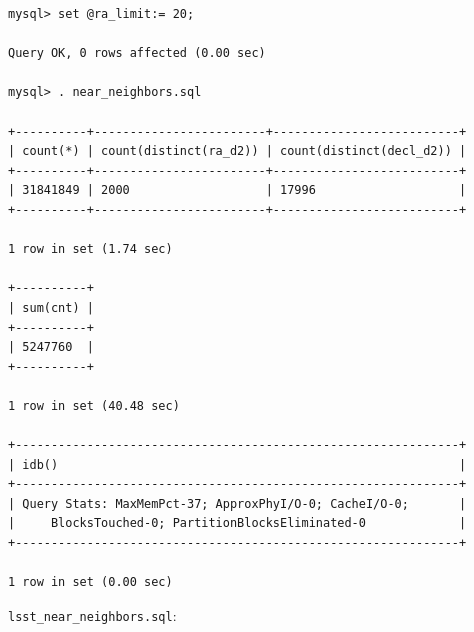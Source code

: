\documentclass[DM,lsstdraft,toc]{lsstdoc}
\begin{document}
\begin{verbatim}
mysql> set @ra_limit:= 20;

Query OK, 0 rows affected (0.00 sec)

mysql> . near_neighbors.sql

+----------+------------------------+--------------------------+
| count(*) | count(distinct(ra_d2)) | count(distinct(decl_d2)) |
+----------+------------------------+--------------------------+
| 31841849 | 2000                   | 17996                    |
+----------+------------------------+--------------------------+

1 row in set (1.74 sec)

+----------+
| sum(cnt) |
+----------+
| 5247760  |
+----------+

1 row in set (40.48 sec)

+--------------------------------------------------------------+
| idb()                                                        |
+--------------------------------------------------------------+
| Query Stats: MaxMemPct-37; ApproxPhyI/O-0; CacheI/O-0;       |
|     BlocksTouched-0; PartitionBlocksEliminated-0             |
+--------------------------------------------------------------+

1 row in set (0.00 sec)
\end{verbatim}

\texttt{lsst\_near\_neighbors.sql}:
\end{document}
